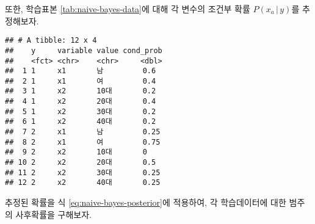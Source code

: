 \documentclass[]{book}
\newenvironment{Shaded}{\begin{snugshade}}{\end{snugshade}}
\newcommand{\DataTypeTok}[1]{\textcolor[rgb]{0.13,0.29,0.53}{#1}}
\newcommand{\DecValTok}[1]{\textcolor[rgb]{0.00,0.00,0.81}{#1}}
\newcommand{\KeywordTok}[1]{\textcolor[rgb]{0.13,0.29,0.53}{\textbf{#1}}}
\newcommand{\NormalTok}[1]{#1}
\newcommand{\OperatorTok}[1]{\textcolor[rgb]{0.81,0.36,0.00}{\textbf{#1}}}
\newcommand{\StringTok}[1]{\textcolor[rgb]{0.31,0.60,0.02}{#1}}
\begin{document}
또한, 학습표본 \ref{tab:naive-bayes-data}에 대해 각 변수의 조건부 확률 \(P(x_a \,|\, y)\)를 추정해보자.

\begin{Shaded}
\end{Shaded}

\begin{verbatim}
## # A tibble: 12 x 4
##    y     variable value cond_prob
##    <fct> <chr>    <chr>     <dbl>
##  1 1     x1       남         0.6 
##  2 1     x1       여         0.4 
##  3 1     x2       10대       0.2 
##  4 1     x2       20대       0.4 
##  5 1     x2       30대       0.2 
##  6 1     x2       40대       0.2 
##  7 2     x1       남         0.25
##  8 2     x1       여         0.75
##  9 2     x2       10대       0   
## 10 2     x2       20대       0.5 
## 11 2     x2       30대       0.25
## 12 2     x2       40대       0.25
\end{verbatim}

추정된 확률을 식 \eqref{eq:naive-bayes-posterior}에 적용하여, 각 학습데이터에 대한 범주의 사후확률을 구해보자.
\end{document}
